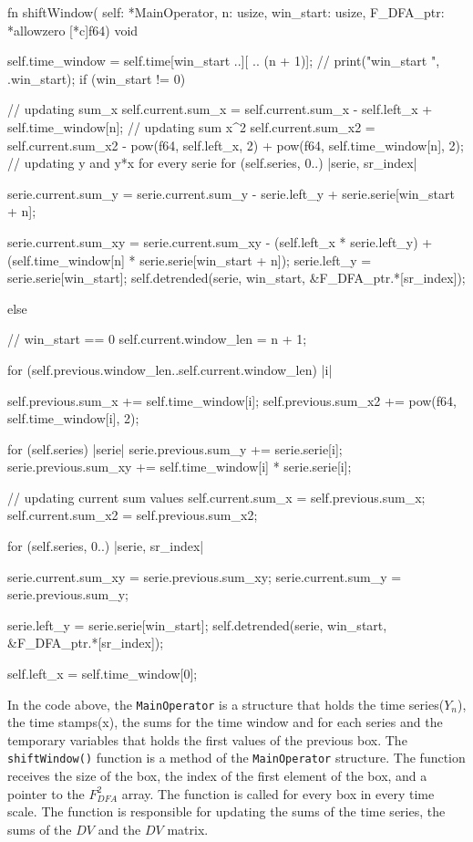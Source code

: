 \documentclass[nojss]{jss}
\begin{document}
\begin{Code}

fn shiftWindow( self: *MainOperator,
                n: usize, win_start: usize,
                F_DFA_ptr: *allowzero [*c]f64) void {
    self.time_window = self.time[win_start ..][ .. (n + 1)];
    // print("win_start {}\n", .{win_start});
    if (win_start != 0) {
        // updating sum_x
        self.current.sum_x = self.current.sum_x - self.left_x + self.time_window[n];
        // updating sum x^2
        self.current.sum_x2 = self.current.sum_x2 - 
        pow(f64, self.left_x, 2) + pow(f64, self.time_window[n], 2);
        // updating y and y*x for every serie
        for (self.series, 0..) |serie, sr_index| {
            serie.current.sum_y = serie.current.sum_y - 
            serie.left_y + serie.serie[win_start + n];

            serie.current.sum_xy = serie.current.sum_xy - 
            (self.left_x * serie.left_y) + 
            (self.time_window[n] * serie.serie[win_start + n]);
            serie.left_y = serie.serie[win_start];
            self.detrended(serie, win_start, &F_DFA_ptr.*[sr_index]);
        }
    } else { // win_start == 0
        self.current.window_len = n + 1;

        for (self.previous.window_len..self.current.window_len) |i| {
            self.previous.sum_x += self.time_window[i];
            self.previous.sum_x2 += pow(f64, self.time_window[i], 2);

            for (self.series) |serie| {
                serie.previous.sum_y += serie.serie[i];
                serie.previous.sum_xy += self.time_window[i] * serie.serie[i];
            }
        }

        // updating current sum values
        self.current.sum_x = self.previous.sum_x;
        self.current.sum_x2 = self.previous.sum_x2;

        for (self.series, 0..) |serie, sr_index| {
            serie.current.sum_xy = serie.previous.sum_xy;
            serie.current.sum_y = serie.previous.sum_y;

            serie.left_y = serie.serie[win_start];
            self.detrended(serie, win_start, &F_DFA_ptr.*[sr_index]);
        }
    }
    self.left_x = self.time_window[0];
}
\end{Code}
In the code above, the \verb"MainOperator" is a structure that holds the time series($Y_n$), the time stamps(x), the sums for the time window and for each series and the temporary variables that holds the first values of the previous box. The \verb"shiftWindow()" function is a method of the \verb"MainOperator" structure. The function receives the size of the box, the index of the first element of the box, and a pointer to the $F_{DFA}^{2}$ array. The function is called for every box in every time scale. The function is responsible for updating the sums of the time series, the sums of the $DV$ and the $DV$ matrix.
\end{document}
